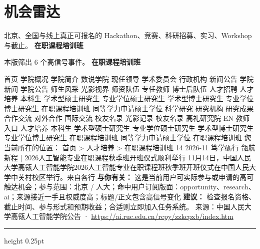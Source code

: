 \documentclass[10.5pt]{ctexart}
\begin{document}
\section*{机会雷达}
{\color{ormuted} 北京、全国与线上真正可报名的 Hackathon、竞赛、科研招募、实习、Workshop 与截止。}
\vspace{2mm}
{\LARGE\bfseries 在职课程培训班}\par
\vspace{1mm}
{\color{ormuted} 本版筛出 6 个高信号事件。}
\vspace{3mm}
{\Large\bfseries 在职课程培训班}\par
首页 学院概况 学院简介 数说学院 现任领导 学术委员会 行政机构 新闻公告 学院新闻 学院公告 师生风采 光影视界 师资队伍 专任教师 博士后队伍 人才招聘 人才培养 本科生 学术型硕士研究生 专业学位硕士研究生 学术型博士研究生 专业学位博士研究生 在职课程培训班 同等学力申请硕士学位 科学研究 研究机构 研究成果 合作交流 对外合作 国际交流 校友名录 光影记录 校友名录 高礼研究院 EN 教师入口 人才培养 本科生 学术型硕士研究生 专业学位硕士研究生 学术型博士研究生 专业学位博士研究生 在职课程培训班 同等学力申请硕士学位 在职课程培训班 您当前所在的位置： 首页 > 人才培养 > 在职课程培训班 14 2026-11 笃学砺行 瓴航新程 | 2026人工智能专业在职课程秋季班开班仪式顺利举行 11月14日，中国人民大学高瓴人工智能学院2026人工智能专业在职课程班秋季班开班仪式在中国人民大学中关村校区举行。来自各行
\textbf{与你有关：} 这是当前用户可实际参与或申请的高可触达机会；参与范围：北京 / 人大；命中用户订阅版面：opportunity、research、ai；来源接近一手且权威度高；标题/正文包含高信号变化
\textbf{建议：} 检查报名资格、截止时间、参与形式和预期收益；合适则立即加入任务系统。
{\footnotesize\color{ormuted} 来源：中国人民大学高瓴人工智能学院公告 · \url{https://ai.ruc.edu.cn/rcpy/zzkcpxb/index.htm}}
\vspace{4mm}
\hrule height 0.25pt
\vspace{3mm}
\end{document}
